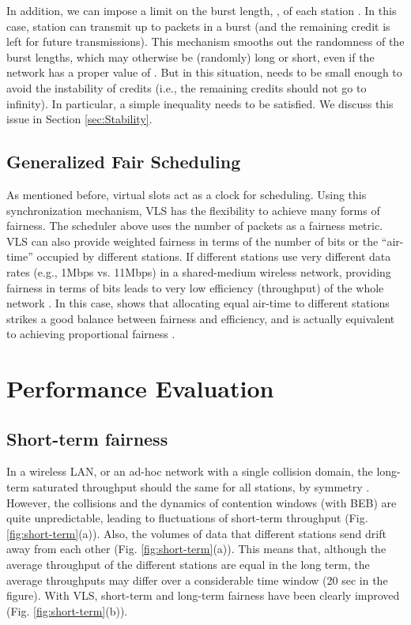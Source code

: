 \documentclass[letterpaper, 10 pt, conference]{ieeeconf}
\begin{document}
In addition, we can impose a limit on the burst length, , of each
station . In this case, station  can transmit up to 
packets in a burst (and the remaining credit is left for future transmissions). This mechanism smooths out the randomness of the burst lengths,
which may otherwise be (randomly) long or short, even if the
network has a proper value of . But in this situation,  needs to be
small enough to avoid the instability of credits (i.e., the remaining credits 
should not go to infinity). In particular, a
simple inequality needs to be satisfied. We discuss this issue
in Section \ref{sec:Stability}.



\subsection{\label{sub:Generalized-Fair-Scheduling}Generalized Fair Scheduling}

As mentioned before, virtual slots act as a clock for scheduling.
Using this synchronization mechanism, VLS has the flexibility to achieve many forms of
fairness. The scheduler above uses the number of packets as a fairness metric.
VLS can also provide weighted fairness in terms of the number of bits
or the {}``air-time'' occupied by different stations. If different
stations use very different data rates (e.g., 1Mbps vs. 11Mbps) in
a shared-medium wireless network, providing fairness in terms of bits
leads to very low efficiency (throughput) of the whole network \cite{PF_Jiang}.
In this case, \cite{PF_Jiang} shows that allocating equal air-time
to different stations strikes a good balance between fairness and
efficiency, and is actually equivalent to achieving proportional fairness
\cite{kelly97charging}.

\section{Performance Evaluation}


\subsection{Short-term fairness}

In a wireless LAN, or an ad-hoc network with a single collision domain,
the long-term saturated throughput should the same for all stations, by symmetry \cite{Bianchi}.
However, the collisions and the dynamics of contention windows (with
BEB) are quite unpredictable, leading to fluctuations of short-term
throughput (Fig. \ref{fig:short-term}(a)). Also, the volumes of data
that different stations send drift away from each other (Fig. \ref{fig:short-term}(a)).
This means that, although the average throughput of the different stations
are equal in the long term, the average throughputs may differ over a
considerable time window (20 sec in the figure). With VLS, short-term
and long-term fairness have been clearly improved (Fig. \ref{fig:short-term}(b)).
\end{document}
